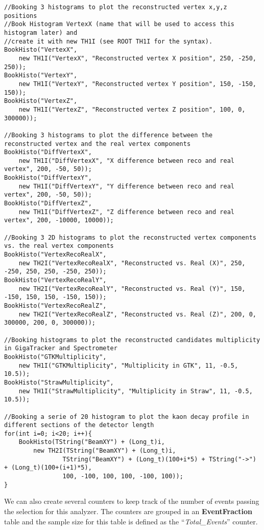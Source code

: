 \documentclass{article}
\newcommand{\class}[1]{\textbf{#1}}
\newcommand{\refcode}[1]{``\textit{#1}''}
\begin{document}
\begin{lstlisting}
//Booking 3 histograms to plot the reconstructed vertex x,y,z positions
//Book Histogram VertexX (name that will be used to access this histogram later) and 
//create it with new TH1I (see ROOT TH1I for the syntax).
BookHisto("VertexX", 
	new TH1I("VertexX", "Reconstructed vertex X position", 250, -250, 250));
BookHisto("VertexY", 
	new TH1I("VertexY", "Reconstructed vertex Y position", 150, -150, 150));
BookHisto("VertexZ", 
	new TH1I("VertexZ", "Reconstructed vertex Z position", 100, 0, 300000));

//Booking 3 histograms to plot the difference between the reconstructed vertex and the real vertex components
BookHisto("DiffVertexX", 
	new TH1I("DiffVertexX", "X difference between reco and real vertex", 200, -50, 50));
BookHisto("DiffVertexY", 
	new TH1I("DiffVertexY", "Y difference between reco and real vertex", 200, -50, 50));
BookHisto("DiffVertexZ", 
	new TH1I("DiffVertexZ", "Z difference between reco and real vertex", 200, -10000, 10000));

//Booking 3 2D histograms to plot the reconstructed vertex components vs. the real vertex components
BookHisto("VertexRecoRealX", 
	new TH2I("VertexRecoRealX", "Reconstructed vs. Real (X)", 250, -250, 250, 250, -250, 250));
BookHisto("VertexRecoRealY", 
	new TH2I("VertexRecoRealY", "Reconstructed vs. Real (Y)", 150, -150, 150, 150, -150, 150));
BookHisto("VertexRecoRealZ", 
	new TH2I("VertexRecoRealZ", "Reconstructed vs. Real (Z)", 200, 0, 300000, 200, 0, 300000));

//Booking histograms to plot the reconstructed candidates multiplicity in GigaTracker and Spectrometer
BookHisto("GTKMultiplicity", 
	new TH1I("GTKMultiplicity", "Multiplicity in GTK", 11, -0.5, 10.5));
BookHisto("StrawMultiplicity", 
	new TH1I("StrawMultiplicity", "Multiplicity in Straw", 11, -0.5, 10.5));

//Booking a serie of 20 histogram to plot the kaon decay profile in different sections of the detector length
for(int i=0; i<20; i++){
	BookHisto(TString("BeamXY") + (Long_t)i, 
		new TH2I(TString("BeamXY") + (Long_t)i,
				TString("BeamXY") + (Long_t)(100+i*5) + TString("->") + (Long_t)(100+(i+1)*5),
				100, -100, 100, 100, -100, 100));
}
\end{lstlisting}

We can also create several counters to keep track of the number of events passing the selection for
this analyzer. The counters are grouped in an \class{EventFraction} table and the sample size for
this table is defined as the \refcode{Total\_Events} counter.
\end{document}
